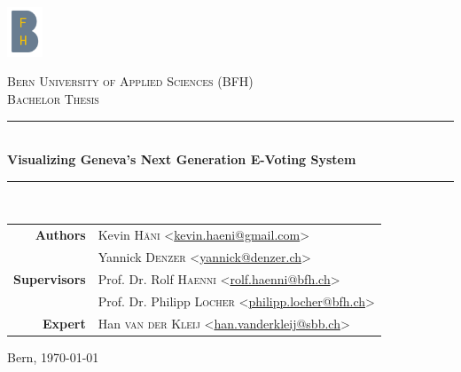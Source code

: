 \begin{titlepage}
\begin{center}
	\includegraphics[width=0.08\textwidth]{assets/bfh_logo.png}

	\vspace{1cm}

	\textsc{\Large Bern University of Applied Sciences (BFH)} \\[1.5cm]
	\textsc{\Large Bachelor Thesis} \\[1cm]

	\newcommand{\HRule}{\rule{\linewidth}{0.3mm}}
	\HRule \\[0.4cm]
	{\Large \bfseries Visualizing Geneva's Next Generation E-Voting System} \\
	\HRule \\[1.5cm]

	\begin{tabular}{rl}
	\textbf{Authors}
	& Kevin \textsc{Häni} <\href{mailto:kevin.haeni@gmail.com}{kevin.haeni@gmail.com}> \\
	& Yannick \textsc{Denzer} <\href{mailto:yannick@denzer.ch}{yannick@denzer.ch}> \\
	\textbf{Supervisors}
	& Prof. Dr. Rolf \textsc{Haenni} <\href{mailto:rolf.haenni@bfh.ch}{rolf.haenni@bfh.ch}> \\
	& Prof. Dr. Philipp \textsc{Locher} <\href{mailto:philipp.locher@bfh.ch}{philipp.locher@bfh.ch}> \\
	\textbf{Expert}
	 & Han \textsc{van der Kleij} <\href{mailto:han.vanderkleij@sbb.ch}{han.vanderkleij@sbb.ch}>\\
	\end{tabular}

	\vfill

	Bern, {\large \today}
\end{center}
\end{titlepage}
